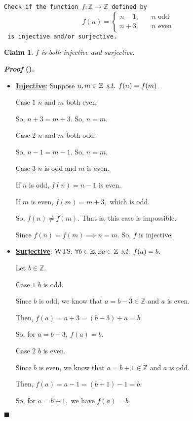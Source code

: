\documentclass[12pt,a4paper]{article}
\newtheorem{clm}{Claim}[subsection]
\newcounter{nprf}[subsection]
\newenvironment*{prf}{\par\indent\textbf{\textit{Proof} (\stepcounter{nprf}\thenprf). }\par }{\par\hfill $\blacksquare$\par}
\def\Z{{\mathbb{Z}}}
\def\st{\emph{ s.t. }}
\begin{document}
\begin{framed}
\noindent\texttt{Check if the function $f:\Z\to\Z$ defined by \[f(n)=\begin{cases}n-1,\quad&n\text{ odd}\\n+3,\quad&n\text{ even}\end{cases}\] is injective and/or surjective.}
\begin{clm} $f$ is both injective and surjective. \end{clm}
\begin{prf}
\begin{itemize}
	\item \textbf{\underline{Injective}}: Suppose $n,m\in\Z\st f(n)=f(m)$.\par $\boxed{\text{Case }1}$ $n$ and $m$ both even.\par\hspace{5mm} So, $n+3=m+3.$ So, $n=m.$\par $\boxed{\text{Case }2}$ $n$ and $m$ both odd.\par\hspace{5mm} So, $n-1=m-1.$ So, $n=m.$\par $\boxed{\text{Case }3}$ $n$ is odd and $m$ is even. \par\hspace{5mm} If $n$ is odd, $f(n)=n-1$ is even.\par\hspace{5mm} If $m$ is even, $f(m)=m+3,$ which is odd. \par\hspace{5mm} So, $f(n)\neq f(m).$ That is, this case is impossible.\par Since $f(n)=f(m)\implies n=m.$ So, $f$ is injective. 
	\item \textbf{\underline{Surjective}}: WTS: $\forall b\in\Z, \exists a\in\Z\st f(a)=b.$\par Let $b\in\Z.$\par $\boxed{\text{Case }1}$ $b$ is odd.\par\hspace{5mm} Since $b$ is odd, we know that $a=b-3\in\Z$ and $a$ is even.\par\hspace{5mm} Then, $f(a)=a+3=(b-3)+a=b.$\par\hspace{5mm} So, for $a=b-3,\ f(a)=b.$\par $\boxed{\text{Case }2}$ $b$ is even.\par\hspace{5mm} Since $b$ is even, we know that $a=b+1\in\Z$ and $a$ is odd.\par\hspace{5mm} Then, $f(a)=a-1=(b+1)-1=b.$\par\hspace{5mm} So, for $a=b+1,$ we have $f(a)=b.$
\end{itemize}	
\end{prf}
\end{framed}
\end{document}
